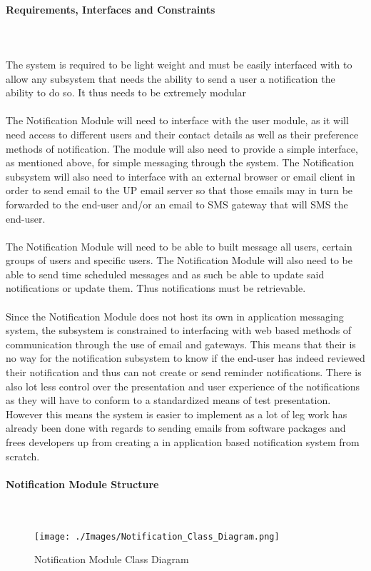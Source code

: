 \documentclass{article}
\begin{document}
			\paragraph	{Requirements, Interfaces and Constraints} \mbox{} \\\\
			{The system is required to be light weight and must be easily interfaced with to allow any subsystem that needs the ability to send a user a notification the ability to do so. It thus needs to be extremely modular \\ \\The Notification Module will need to interface with the user module, as it will need access to different users and their contact details as well as their preference methods of notification. The module will also need to provide a simple interface, as mentioned above, for simple messaging through the system. The Notification subsystem will also need to interface with an external browser or email client in order to send email to the UP email server so that those emails may in turn be forwarded to the end-user and/or an email to SMS gateway that will SMS the end-user.\\ \\The Notification Module will need to be able to built message all users, certain groups of users and specific users. The Notification Module will also need to be able to send time scheduled messages and as such be able to update said notifications or update them. Thus notifications must be retrievable.\\ \\Since the Notification Module does not host its own in application messaging system, the subsystem is constrained to interfacing with web based methods of communication through the use of email and gateways. This means that their is no way for the notification subsystem to know if the end-user has indeed reviewed their notification and thus can not create or send reminder notifications. There is also lot less control over the presentation and user experience of the notifications as they will have to conform to a standardized means of test presentation. However this means the system is easier to implement as a lot of leg work has already been done with regards to sending emails from software packages and frees developers up from creating a in application based notification system from scratch.}
		
			\newpage
			\paragraph	{Notification Module Structure} \mbox{} \\
			\begin{figure}[h]
				\texttt{[image: ./Images/Notification\_Class\_Diagram.png]} 
				\caption{Notification Module Class Diagram}
			\end{figure}
			
\end{document}
